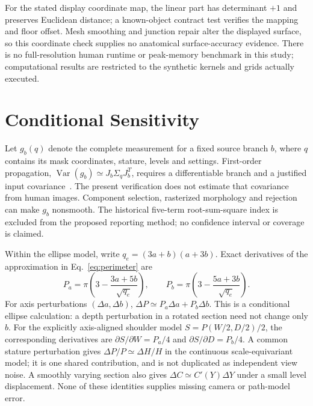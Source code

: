\documentclass[11pt,a4paper]{article}
\begin{document}
For the stated display coordinate map, the linear part has determinant $+1$ and preserves Euclidean distance; a known-object contract test verifies the mapping and floor offset. Mesh smoothing and junction repair alter the displayed surface, so this coordinate check supplies no anatomical surface-accuracy evidence. There is no full-resolution human runtime or peak-memory benchmark in this study; computational results are restricted to the synthetic kernels and grids actually executed.

\section{Conditional Sensitivity}
Let $g_b(q)$ denote the complete measurement for a fixed source branch $b$, where $q$ contains its mask coordinates, stature, levels and settings. First-order propagation, $\operatorname{Var}(g_b)\simeq J_b\Sigma_qJ_b^T$, requires a differentiable branch and a justified input covariance~\cite{jcgm2008}. The present verification does not estimate that covariance from human images. Component selection, rasterized morphology and rejection can make $g_b$ nonsmooth. The historical five-term root-sum-square index is excluded from the proposed reporting method; no confidence interval or coverage is claimed.

Within the ellipse model, write $q_e=(3a+b)(a+3b)$. Exact derivatives of the approximation in Eq.~\eqref{eq:perimeter} are
\begin{equation}
 P_a=\pi\left(3-\frac{3a+5b}{\sqrt{q_e}}\right),\qquad
 P_b=\pi\left(3-\frac{5a+3b}{\sqrt{q_e}}\right).
 \label{eq:derivative}
\end{equation}
For axis perturbations $(\Delta a,\Delta b)$, $\Delta P\simeq P_a\Delta a+P_b\Delta b$. This is a conditional ellipse calculation: a depth perturbation in a rotated section need not change only $b$. For the explicitly axis-aligned shoulder model $S=P(W/2,D/2)/2$, the corresponding derivatives are $\partial S/\partial W=P_a/4$ and $\partial S/\partial D=P_b/4$. A common stature perturbation gives $\Delta P/P\simeq\Delta H/H$ in the continuous scale-equivariant model; it is one shared contribution, and is not duplicated as independent view noise. A smoothly varying section also gives $\Delta C\simeq C'(Y)\Delta Y$ under a small level displacement. None of these identities supplies missing camera or path-model error.
\end{document}
